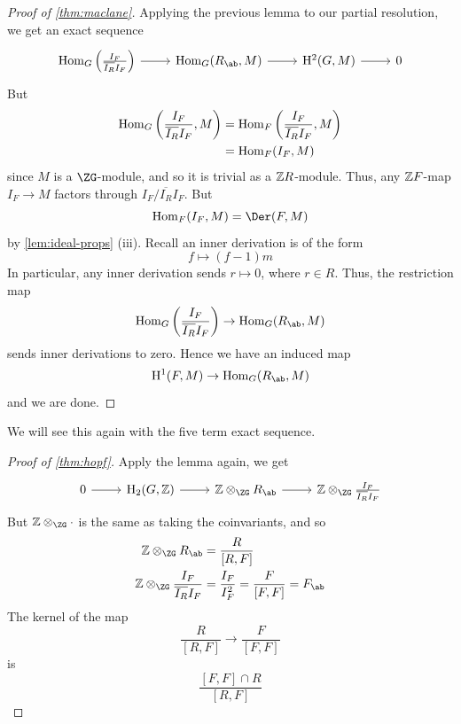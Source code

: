 \documentclass{article}
\begin{document}
\begin{proof}
    [Proof of \cref{thm:maclane}] Applying the previous lemma to our partial resolution, we get an exact sequence
\[\begin{tikzcd}
	{\Hom_G\left(\frac{I_F}{\overline{I_R}I_F}\right)} & {\Hom_G(R_\ab, M)} & {\HH^2(G,M)} & 0
	\arrow[from=1-1, to=1-2]
	\arrow[from=1-2, to=1-3]
	\arrow[from=1-3, to=1-4]
\end{tikzcd}\]
    But
    \begin{align*}
        \operatorname{Hom}_G\left(\frac{I_F}{\overline{I_R}I_F}, M\right) &= \operatorname{Hom}_F\left(\frac{I_F}{\overline{I_R}I_F}, M\right) \\
        &= \operatorname{Hom}_F(I_F, M)
    \end{align*}
    since \(M\) is a \(\ZG\)-module, and so it is trivial as a \(\mathbb{Z} R\)-module. Thus, any \(\mathbb{Z} F\)-map \(I_F \to M\) factors through \(I_F/\overline{I_R}I_F\).
    But
    \[\Hom_F(I_F, M) = \Der(F, M)\]
    by \cref{lem:ideal-props} (iii). Recall an inner derivation is of the form
    \[f \mapsto (f - 1)m\]
    In particular, any inner derivation sends \(r \mapsto 0\), where \(r \in R\). Thus, the restriction map
    \[\Hom_G\left(\frac{I_F}{\overline{I_R}I_F}\right) \to \Hom_G(R_\ab, M)\]
    sends inner derivations to zero. Hence we have an induced map
    \[\HH^1(F, M) \to \Hom_G(R_\ab, M)\]
    and we are done.
\end{proof}

\begin{remark}
    We will see this again with the five term exact sequence.
\end{remark}

\begin{proof}
    [Proof of \cref{thm:hopf}] Apply the lemma again, we get
\[\begin{tikzcd}
	0 & {\HH_2(G, \Z)} & {\Z\otimes_{\ZG} R_\ab} & {\Z\otimes_{\ZG}\frac{I_F}{\overline{I_R}I_F}}
	\arrow[from=1-1, to=1-2]
	\arrow[from=1-2, to=1-3]
	\arrow[from=1-3, to=1-4]
\end{tikzcd}\]
    But \(\Z \otimes_{\ZG} \cdot\) is the same as taking the coinvariants, and so 
    \begin{align*}
        \Z \otimes_{\ZG} R_\ab &= \frac{R}{[R, F]} \\
        \Z \otimes_{\ZG} \frac{I_F}{\overline{I_R}I_F} &= \frac{I_F}{I_F^2} = \frac{F}{[F, F]} = F_\ab
    \end{align*}
    The kernel of the map
    \[\frac{R}{[R, F]} \to \frac{F}{[F, F]}\]
    is
    \[\frac{[F, F] \cap R}{[R, F]}\]
\end{proof}
\end{document}
